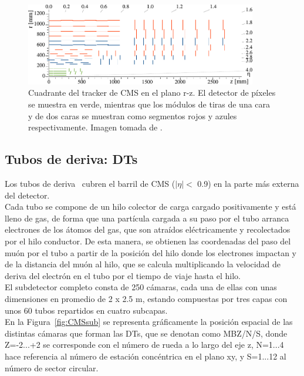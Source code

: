\begin{figure}[h]
\centering
\includegraphics[width=0.9\textwidth]{figures/Phase1_Tracker_1Quarter.png}
\caption{Cuadrante del tracker de CMS en el plano r-z. El detector de p\'ixeles se muestra en verde, mientras que los m\'odulos de tiras de una cara y de dos caras se muestran como segmentos rojos y azules respectivamente. Imagen tomada de \cite{trackerplot}.}
\label{fig:tracker}
\end{figure}


\subsection{Tubos de deriva: DTs}\label{sec:DTs}

Los tubos de deriva~\cite{DTperformance} cubren el barril de CMS ($\lvert \eta \rvert <$ 0.9) en la parte m\'as externa del detector. \\
Cada tubo se compone de un hilo colector de carga cargado positivamente y est\'a lleno de gas, de forma que una part\'icula cargada a su paso por el tubo arranca electrones de los \'atomos del gas, que son atra\'idos el\'ectricamente y recolectados por el hilo conductor. De esta manera, se obtienen las coordenadas del paso del mu\'on por el tubo a partir de la posici\'on del hilo donde los electrones impactan y de la distancia del mu\'on al hilo, que se calcula multiplicando la velocidad de deriva del electr\'on en el tubo por el tiempo de viaje hasta el hilo. \\

El subdetector completo consta de 250 c\'amaras, cada una de ellas con unas dimensiones en promedio de 2 x 2.5 m, estando compuestas por tres capas con unos 60 tubos repartidos en cuatro subcapas. \\

En la Figura~\ref{fig:CMSsub} se representa gr\'aficamente la posici\'on espacial de las distintas c\'amaras que forman las DTs, que se denotan como MBZ/N/S, donde Z=-2...+2 se corresponde con el n\'umero de rueda a lo largo del eje z, N=1...4 hace referencia al n\'umero de estaci\'on conc\'entrica en el plano xy, y S=1...12 al n\'umero de sector circular. 


